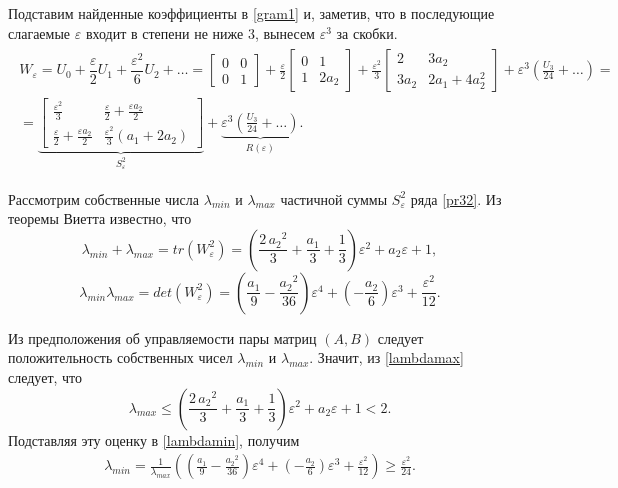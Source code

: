 \documentclass[../main.tex]{subfiles}
\begin{document}
Подставим найденные коэффициенты в \eqref{gram1} и, заметив, что в последующие слагаемые $ \varepsilon $ входит в степени не ниже $ 3 $, вынесем $ \varepsilon^3 $ за скобки.
\begin{gather}\label{pr32}
	\begin{gathered}
		W_{\varepsilon} = U_0 + \dfrac{\varepsilon}{2} U_1 + \dfrac{\varepsilon^2}{6}U_2 + \dots = \left[ {\begin{array}{*{20}{c}}
				0&0\\
				0&1
		\end{array}}\right] +\frac{\varepsilon}{2} \left[ {\begin{array}{*{20}{c}}
				0&1\\
				1&2a_2
		\end{array}}\right] +\frac{\varepsilon^2}{3} \left[ {\begin{array}{*{20}{c}}
				2&3a_2\\
				3a_2&2a_1+4a_2^2
		\end{array}}\right] + \varepsilon^3 \left( \frac{U_3}{24} + \dots \right) =
		\\
		= \underbrace{\left[ \begin{array}{*{20}{c}}
				\frac{\varepsilon^2}{3} & \frac{\varepsilon}{2} + \frac{\varepsilon a_2}{2} \\ 
				\frac{\varepsilon}{2} + \frac{\varepsilon a_2}{2} & \frac{\varepsilon^2}{3}(a_1+2a_2) 
			\end{array} \right]}_{S_{\varepsilon}^{2}} + \underbrace{ \varepsilon^3 \left( \frac{U_3}{24} + \dots \right)}_{R(\varepsilon)}.
	\end{gathered}
\end{gather}


Рассмотрим собственные числа $ \lambda_{min} $ и $ \lambda_{max} $ частичной суммы $ S_{\varepsilon}^{2} $ ряда \eqref{pr32}. Из теоремы Виетта известно, что 
\begin{equation}\label{lambdamax}
	\lambda_{min} + \lambda_{max} = tr(W_{\varepsilon}^{2}) = \left(\frac{2\,{a_{2}}^2}{3}+\frac{a_{1}}{3}+\frac{1}{3}\right)\varepsilon^2+a_{2}\varepsilon+1,
\end{equation}
\begin{equation}\label{lambdamin}
	\lambda_{min}  \lambda_{max} = det(W_{\varepsilon}^{2}) = \left(\frac{a_{1}}{9}-\frac{{a_{2}}^2}{36}\right)\varepsilon^4+\left(-\frac{a_{2}}{6}\right)\varepsilon^3+\frac{\varepsilon^2}{12}.
\end{equation}

Из предположения об управляемости пары матриц $ (A,B) $ следует положительность собственных чисел $ \lambda_{min} $ и $ \lambda_{max} $. Значит, из \eqref{lambdamax} следует, что
\begin{equation*}
	\lambda_{max} \leq \left(\frac{2\,{a_{2}}^2}{3}+\frac{a_{1}}{3}+\frac{1}{3}\right)\varepsilon^2+a_{2}\varepsilon+1 < 2.
\end{equation*}
Подставляя эту оценку в \eqref{lambdamin}, получим
\begin{gather*}
	\lambda_{min} = \frac{1}{\lambda_{max}}\left(  \left(\frac{a_{1}}{9}-\frac{{a_{2}}^2}{36}\right)\varepsilon^4+\left(-\frac{a_{2}}{6}\right)\varepsilon^3+\frac{\varepsilon^2}{12}\right) \geq \frac{\varepsilon^2}{24}.
\end{gather*}
\end{document}
